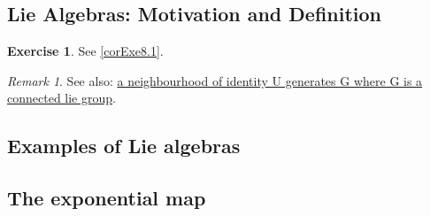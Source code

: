 \documentclass[12pt, letterpaper]{article}
\theoremstyle{definition}
\theoremstyle{remark}
\newtheorem*{rem*}{Remark}
\theoremstyle{definition}
\newtheorem{exe}{Exercise}[section]
\theoremstyle{plain}
\numberwithin{equation}{section}
\begin{document}
	
	\subsection{Lie Algebras: Motivation and Definition}
	\begin{exe}
		See \ref{corExe8.1}.
	\end{exe}
	\begin{rem*}
		See also: \href{https://math.stackexchange.com/questions/282442/a-neighbourhood-of-identity-u-generates-g-where-g-is-a-connected-lie-group}{a neighbourhood of identity U generates G where G is a connected lie group}.
	\end{rem*}
	
	\subsection{Examples of Lie algebras}
	\subsection{The exponential map}
\end{document}
